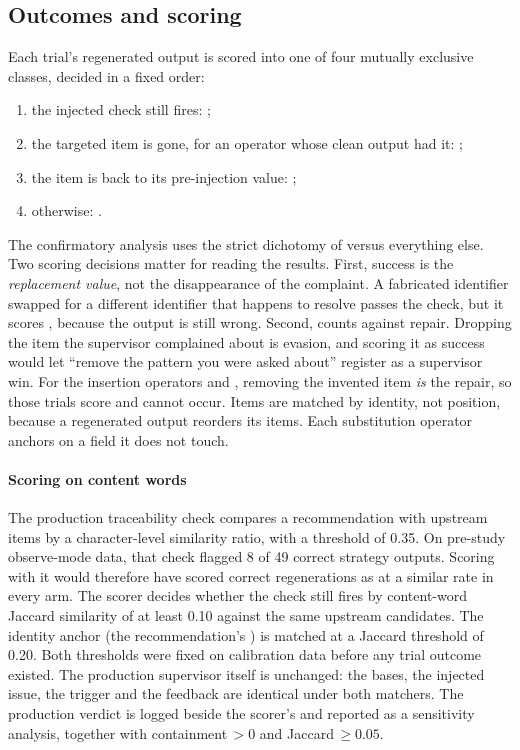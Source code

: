 \subsection{Outcomes and scoring}
\label{sec:design-outcomes}

Each trial's regenerated output is scored into one of four mutually exclusive
classes, decided in a fixed order:
\begin{enumerate}[label=(\roman*)]
\item the injected check still fires: ;
\item the targeted item is gone, for an operator whose clean output had it:
  ;
\item the item is back to its pre-injection value: ;
\item otherwise: .
\end{enumerate}
The confirmatory analysis uses the strict dichotomy of  versus
everything else. Two scoring decisions matter for reading the results. First,
success is the \emph{replacement value}, not the disappearance of the
complaint. A fabricated identifier swapped for a different identifier that
happens to resolve passes the check, but it scores , because the
output is still wrong. Second,  counts against repair. Dropping
the item the supervisor complained about is evasion, and scoring it as success
would let ``remove the pattern you were asked about'' register as a supervisor
win. For the insertion operators  and , removing the invented
item \emph{is} the repair, so those trials score  and
 cannot occur. Items are matched by identity, not position,
because a regenerated output reorders its items. Each substitution operator
anchors on a field it does not touch.

\paragraph{Scoring  on content words}
The production traceability check compares a recommendation with upstream
items by a character-level similarity ratio, with a threshold of 0.35. On
pre-study observe-mode data, that check flagged 8 of 49 correct strategy
outputs. Scoring  with it would therefore have scored correct
regenerations as  at a similar rate in every arm. The scorer
decides whether the  check still fires by content-word Jaccard
similarity of at least 0.10 against the same upstream candidates. The identity
anchor (the recommendation's ) is matched at a Jaccard threshold
of 0.20. Both thresholds were fixed on calibration data before any trial
outcome existed. The production supervisor itself is unchanged: the 
bases, the injected issue, the trigger and the  feedback are identical
under both matchers. The production verdict is logged beside the scorer's and
reported as a sensitivity analysis, together with containment\,$>0$ and
Jaccard\,$\ge 0.05$.


